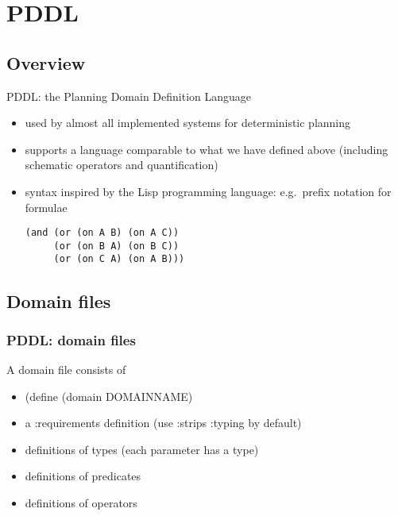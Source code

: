 \documentclass{gkibeamer}
\begin{document}
\section{PDDL}
\subsection{Overview}

\begin{frame}[containsverbatim]{PDDL: the Planning Domain Definition Language}

\begin{itemize}
\item used by almost all implemented systems for deterministic planning
\item supports a language comparable to what we have defined above
(including schematic operators and quantification)
\item syntax inspired by the Lisp programming language: e.g.\ prefix notation
for formulae
\begin{verbatim}
(and (or (on A B) (on A C))
     (or (on B A) (on B C))
     (or (on C A) (on A B)))
\end{verbatim}
\end{itemize}


\end{frame}

\subsection{Domain files}

\begin{frame}
\frametitle{PDDL: domain files}

A domain file consists of
\begin{itemize}
\item (define (domain DOMAINNAME)
\item a :requirements definition (use :strips :typing by default)
\item definitions of types (each parameter has a type)
\item definitions of predicates
\item definitions of operators
\end{itemize}

\end{frame}
\end{document}

